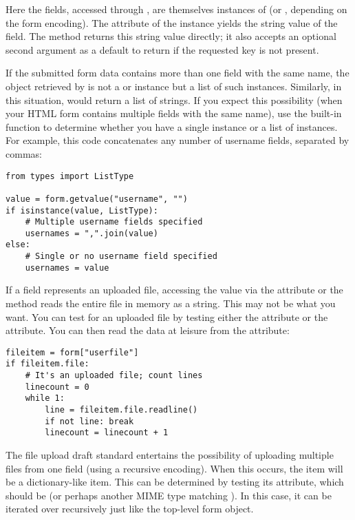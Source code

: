Here the fields, accessed through , are
themselves instances of  (or
, depending on the form encoding).
The  attribute of the instance yields the string value
of the field.  The  method returns this string value
directly; it also accepts an optional second argument as a default to
return if the requested key is not present.

If the submitted form data contains more than one field with the same
name, the object retrieved by  is not a
 or 
instance but a list of such instances.  Similarly, in this situation,
 would return a list of strings.
If you expect this possibility
(when your HTML form contains multiple fields with the same name), use
the  built-in function to determine whether you
have a single instance or a list of instances.  For example, this
code concatenates any number of username fields, separated by
commas:

\begin{verbatim}
from types import ListType

value = form.getvalue("username", "")
if isinstance(value, ListType):
    # Multiple username fields specified
    usernames = ",".join(value)
else:
    # Single or no username field specified
    usernames = value
\end{verbatim}

If a field represents an uploaded file, accessing the value via the
 attribute or the  method reads the
entire file in memory as a string.  This may not be what you want.
You can test for an uploaded file by testing either the 
attribute or the  attribute.  You can then read the data at
leisure from the  attribute:

\begin{verbatim}
fileitem = form["userfile"]
if fileitem.file:
    # It's an uploaded file; count lines
    linecount = 0
    while 1:
        line = fileitem.file.readline()
        if not line: break
        linecount = linecount + 1
\end{verbatim}

The file upload draft standard entertains the possibility of uploading
multiple files from one field (using a recursive
 encoding).  When this occurs, the item will be
a dictionary-like  item.  This can be determined
by testing its  attribute, which should be
 (or perhaps another MIME type matching
).  In this case, it can be iterated over
recursively just like the top-level form object.

